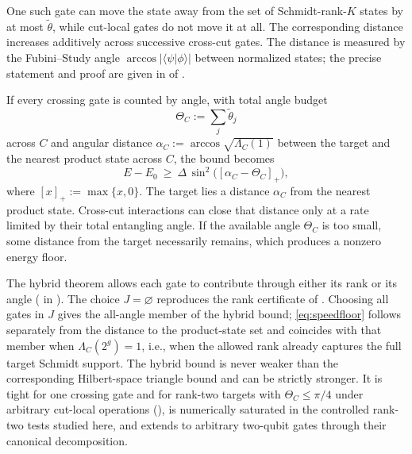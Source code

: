 \documentclass[reprint,aps,pra,floatfix,superscriptaddress,nofootinbib,longbibliography]{revtex4-2}
\theoremstyle{remark}
\theoremstyle{definition}
\newcommand{\braket}[2]{\langle #1 \vert #2 \rangle}
\begin{document}
One such gate can move the state away from the set of Schmidt-rank-$K$ states
by at most $\tilde\theta$, while cut-local gates do not move it at all. The corresponding distance increases additively across successive cross-cut
gates. The distance
is measured by the Fubini--Study angle $\arccos|\braket{\psi}{\phi}|$ between
normalized states; the precise statement and proof are given in
 of .

If every crossing gate is counted by angle, with total angle budget
\begin{equation}
  \Theta_C:=\sum_j\tilde\theta_j
\end{equation}
across $C$ and angular distance $\alpha_C:=\arccos\sqrt{\Lambda_C(1)}$ between
the target and the nearest product state across $C$, the bound becomes
\begin{equation}
  \label{eq:speedfloor}
  E-E_0\ \ge\ \Delta\,\sin^2\bigl([\alpha_C-\Theta_C]_+\bigr),
\end{equation}
where $[x]_+:=\max\{x,0\}$. The target lies a distance $\alpha_C$ from the
nearest product state. Cross-cut
interactions can close that distance only at a rate limited by their total
entangling angle. If the available angle $\Theta_C$ is too small, some distance
from the target necessarily remains, which produces a nonzero energy floor.

The hybrid theorem allows each gate to contribute through either its rank or its
angle ( in ). The choice $J=\varnothing$
reproduces the rank certificate of . Choosing all gates in $J$
gives the all-angle member of the hybrid bound; \eqref{eq:speedfloor} follows
separately from the distance to the product-state set and coincides with that
member when $\Lambda_C(2^g)=1$, i.e., when the allowed rank already captures the
full target Schmidt support. The hybrid bound is never weaker than the
corresponding Hilbert-space triangle bound and can be strictly stronger. It
is tight for one crossing gate and for rank-two targets with $\Theta_C\le\pi/4$
under arbitrary cut-local operations (), is numerically
saturated in the controlled rank-two tests studied here, and extends to
arbitrary two-qubit gates through their canonical decomposition.
\end{document}
